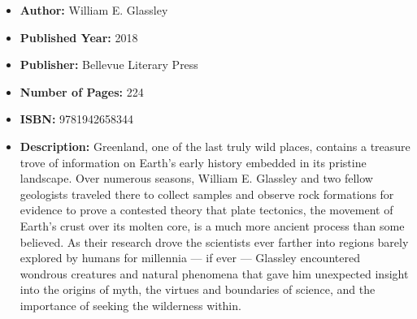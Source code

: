 \documentclass{tufte-handout}
\begin{document}
\begin{itemize}
    \item[] \textbf{Author:} William E. Glassley 
    \item[] \textbf{Published Year:} 2018
    \item[] \textbf{Publisher:} Bellevue Literary Press
    \item[] \textbf{Number of Pages:} 224    
    \item[] \textbf{ISBN:} 9781942658344
    \item[] \textbf{Description:} Greenland, one of the last truly wild places, contains a treasure trove of information on Earth’s early history embedded in its pristine landscape. Over numerous seasons, William E. Glassley and two fellow geologists traveled there to collect samples and observe rock formations for evidence to prove a contested theory that plate tectonics, the movement of Earth’s crust over its molten core, is a much more ancient process than some believed. As their research drove the scientists ever farther into regions barely explored by humans for millennia --- if ever --- Glassley encountered wondrous creatures and natural phenomena that gave him unexpected insight into the origins of myth, the virtues and boundaries of science, and the importance of seeking the wilderness within.
\end{itemize}
\end{document}
